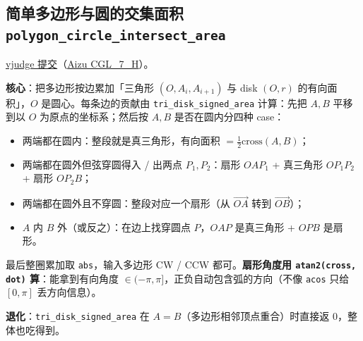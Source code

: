 		\subsection{简单多边形与圆的交集面积 \texttt{polygon\_circle\_intersect\_area}}

		\href{https://vjudge.net/solution/69929628}{vjudge 提交}（\href{https://vjudge.net/problem/Aizu-CGL_7_H}{Aizu CGL\_7\_H}）。

		\textbf{核心}：把多边形按边累加「三角形 $(O, A_i, A_{i+1})$ 与 disk $(O, r)$ 的有向面积」，$O$ 是圆心。每条边的贡献由 \texttt{tri\_disk\_signed\_area} 计算：先把 $A, B$ 平移到以 $O$ 为原点的坐标系；然后按 $A, B$ 是否在圆内分四种 case：
		\begin{itemize}
			\setlength\itemsep{0pt}
			\item 两端都在圆内：整段就是真三角形，有向面积 $= \tfrac{1}{2} \mathrm{cross}(A, B)$；
			\item 两端都在圆外但弦穿圆得入 / 出两点 $P_1, P_2$：扇形 $OAP_1$ + 真三角形 $OP_1 P_2$ + 扇形 $OP_2 B$；
			\item 两端都在圆外且不穿圆：整段对应一个扇形（从 $\vec{OA}$ 转到 $\vec{OB}$）；
			\item $A$ 内 $B$ 外（或反之）：在边上找穿圆点 $P$，$OAP$ 是真三角形 + $OPB$ 是扇形。
		\end{itemize}
		最后整圈累加取 \texttt{abs}，输入多边形 CW / CCW 都可。\textbf{扇形角度用 \texttt{atan2(cross, dot)} 算}：能拿到有向角度 $\in (-\pi, \pi]$，正负自动包含弧的方向（不像 \texttt{acos} 只给 $[0, \pi]$ 丢方向信息）。

		\textbf{退化}：\texttt{tri\_disk\_signed\_area} 在 $A = B$（多边形相邻顶点重合）时直接返 0，整体也吃得到。

